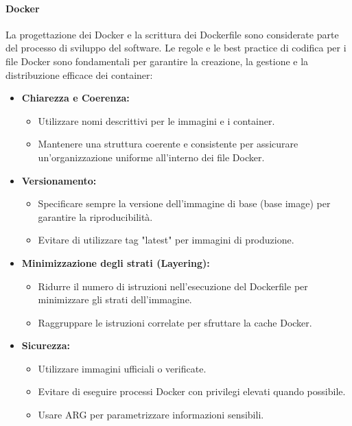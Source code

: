 \documentclass{article}
\begin{document}
\paragraph{Docker}

La progettazione dei Docker e la scrittura dei Dockerfile sono considerate parte del processo di sviluppo del software.
Le regole e le best practice di codifica per i file Docker sono fondamentali per garantire la creazione, la gestione e la distribuzione efficace dei container:
\begin{itemize}
    \item \textbf{Chiarezza e Coerenza:}
    \begin{itemize}
        \item Utilizzare nomi descrittivi per le immagini e i container.
        \item Mantenere una struttura coerente e consistente per assicurare un'organizzazione uniforme all'interno dei file Docker.
    \end{itemize}

\item \textbf{Versionamento:}
    \begin{itemize}
        \item Specificare sempre la versione dell'immagine di base (base image) per garantire la riproducibilità.
        \item Evitare di utilizzare tag "latest" per immagini di produzione.
    \end{itemize}

\item \textbf{Minimizzazione degli strati (Layering):}
    \begin{itemize}
        \item Ridurre il numero di istruzioni nell'esecuzione del Dockerfile per minimizzare gli strati dell'immagine.
        \item Raggruppare le istruzioni correlate per sfruttare la cache Docker.
    \end{itemize}

\item \textbf{Sicurezza:}
    \begin{itemize}
        \item Utilizzare immagini ufficiali o verificate.
        \item Evitare di eseguire processi Docker con privilegi elevati quando possibile.
        \item Usare ARG per parametrizzare informazioni sensibili.
    \end{itemize}


\end{itemize}
\end{document}
